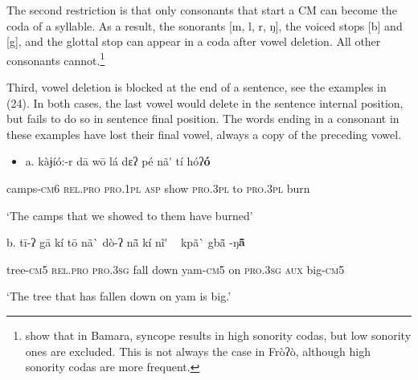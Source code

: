 The second restriction is that only consonants that start a CM can become the coda of a syllable. As a result, the sonorants [m, l, r, ŋ], the voiced stops [b] and [g], and the glottal stop can appear in a coda after vowel deletion. All other consonants cannot.\footnote{\citet{GreenEtAl2014} show that in Bamara, syncope results in high sonority codas, but low sonority ones are excluded. This is not always the case in Fròʔò, although high sonority codas are more frequent.}

Third, vowel deletion is blocked at the end of a sentence, see the examples in (24). In both cases, the last vowel would delete in the sentence internal position, but fails to do so in sentence final position. The words ending in a consonant in these examples have lost their final vowel, always a copy of the preceding vowel.

\begin{itemize}
\item \begin{styleindexi}
    \label{bkm:Ref486144771}a.   kàɉíó:-r            dā            wō           lá    dɛʔ      pé            nã\'{}     tí             hóʔ\textbf{ó} 
\end{styleindexi}\end{itemize}
\begin{styleindexi}
              camps-\textsc{cm}6     \textsc{rel.pro}    \textsc{pro.1pl}    \textsc{asp} show    \textsc{pro.3pl}     to    \textsc{pro.3pl}     burn
\end{styleindexi}

\begin{styleindexi}
            ‘The camps that we showed to them have burned’ 
\end{styleindexi}

\begin{styleindexi}
            b.   tī-ʔ             gā          kí               tō             nã\`{} dò-ʔ      nã\={}    kí            nĩ\'{} ~      kpã\`{} gbã\={} -ŋ\textbf{ã\={} }
\end{styleindexi}

\begin{styleindexi}
              tree-\textsc{cm}5     \textsc{rel.pro}   \textsc{pro.3sg}     fall down  yam-\textsc{cm}5  on    \textsc{pro.3sg}   \textsc{aux}    big-\textsc{cm}5
\end{styleindexi}

\begin{styleindexi}
              ‘The tree that has fallen down on yam is big.’
\end{styleindexi}

